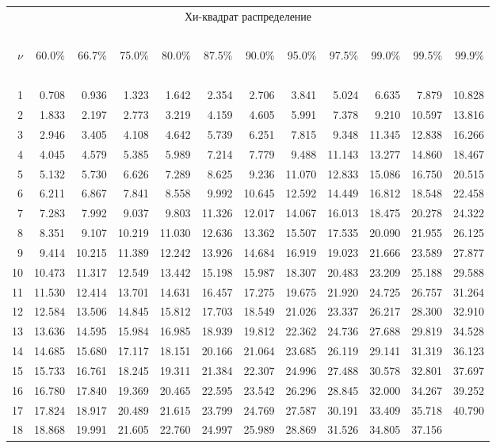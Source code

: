 \documentclass[pdftex,11pt,openany]{book}\usepackage[]{graphicx}\usepackage[]{color}
\begin{document}
{\begin{center}
\begin{tabular}
      {r@{\ }r@{\ }r@{\ }r@{\ }r@{\ }r@{\ }r@{\ }r@{\ }r@{\ }r@{\ }r@{\ }r}
\multicolumn{12}{c}{Хи-квадрат распределение}\\
\ \\
$\nu$&60.0\%&66.7\%&75.0\%&80.0\%&87.5\%&90.0\%&95.0\%&97.5\%&99.0\%&99.5\%
     &99.9\%\\
\ \\
1&0.708&0.936&1.323&1.642&2.354&2.706&3.841&5.024&6.635&7.879&10.828\\
2&1.833&2.197&2.773&3.219&4.159&4.605&5.991&7.378&9.210&10.597&13.816\\
3&2.946&3.405&4.108&4.642&5.739&6.251&7.815&9.348&11.345&12.838&16.266\\
4&4.045&4.579&5.385&5.989&7.214&7.779&9.488&11.143&13.277&14.860&18.467\\
5&5.132&5.730&6.626&7.289&8.625&9.236&11.070&12.833&15.086&16.750&20.515\\
6&6.211&6.867&7.841&8.558&9.992&10.645&12.592&14.449&16.812&18.548&22.458\\
7&7.283&7.992&9.037&9.803&11.326&12.017&14.067&16.013&18.475&20.278&24.322\\
8&8.351&9.107&10.219&11.030&12.636&13.362&15.507&17.535&20.090&21.955&26.125\\
9&9.414&10.215&11.389&12.242&13.926&14.684&16.919&19.023&21.666&23.589
 &27.877\\
10&10.473&11.317&12.549&13.442&15.198&15.987&18.307&20.483&23.209&25.188
  &29.588\\
11&11.530&12.414&13.701&14.631&16.457&17.275&19.675&21.920&24.725&26.757
  &31.264\\
12&12.584&13.506&14.845&15.812&17.703&18.549&21.026&23.337&26.217&28.300
  &32.910\\
13&13.636&14.595&15.984&16.985&18.939&19.812&22.362&24.736&27.688&29.819
  &34.528\\
14&14.685&15.680&17.117&18.151&20.166&21.064&23.685&26.119&29.141&31.319
  &36.123\\
15&15.733&16.761&18.245&19.311&21.384&22.307&24.996&27.488&30.578&32.801
  &37.697\\
16&16.780&17.840&19.369&20.465&22.595&23.542&26.296&28.845&32.000&34.267
  &39.252\\
17&17.824&18.917&20.489&21.615&23.799&24.769&27.587&30.191&33.409&35.718
  &40.790\\
18&18.868&19.991&21.605&22.760&24.997&25.989&28.869&31.526&34.805&37.156

\end{tabular}
\end{center}}
\end{document}
